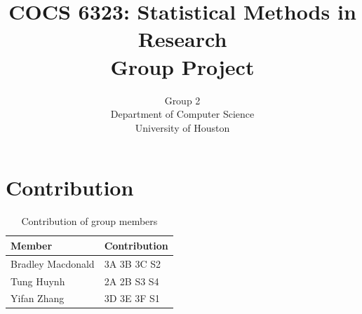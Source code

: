 \documentclass[10pt]{article}         %
\title{COCS 6323: Statistical Methods in Research \\ Group Project} %
\author{Group 2 \\
        Department of Computer Science\\
        University of Houston}         %
\begin{document}



\maketitle              %

\newpage
\tableofcontents        %
\listoftables           %
\listoffigures          %

\newpage
\section{Contribution}
\begin{table}[h]
\begin{tabular}{|l|l|}
\hline
\textbf{Member} & \textbf{Contribution} \\ \hline
Bradley Macdonald & 3A 3B 3C S2\\ \hline
Tung Huynh & 2A 2B S3 S4\\ \hline
Yifan Zhang & 3D 3E 3F S1\\ \hline
\end{tabular}
\caption{Contribution of group members}
\label{tbl:contribution}
\end{table}

\newpage
\end{document}
